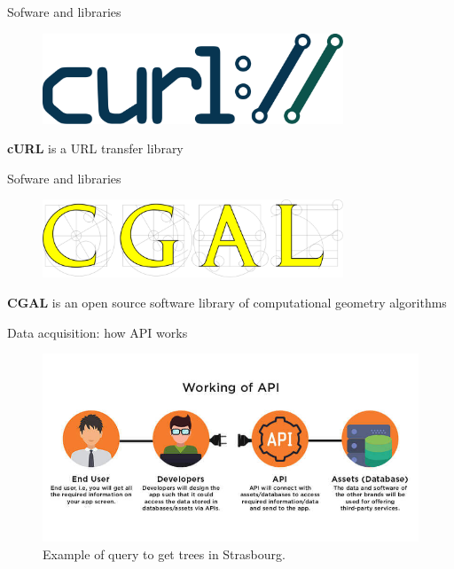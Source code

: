 \documentclass[10pt]{beamer}
\begin{document}
\begin{frame}{Sofware and libraries}
  \begin{figure}[H]
      \centering
      \includegraphics[width=0.8\textwidth]{images/Curl-logo.svg.png}
  \end{figure}
  \begin{center}
  \textbf{cURL} is a URL transfer library
  \end{center}
\end{frame}

\begin{frame}{Sofware and libraries}
  \begin{figure}[H]
      \centering
      \includegraphics[width=0.8\textwidth]{images/cgal_logo.png}
  \end{figure}
  \begin{center}
  \textbf{CGAL} is an open source software library of computational geometry algorithms
  \end{center}
\end{frame}

\begin{frame}{Data acquisition: how API works}
  \begin{figure}[H]
    \centering
    \includegraphics[width=1\textwidth]{images/how-api-works.jpg}
    \caption{Example of query to get trees in Strasbourg.}
  \end{figure}
\end{frame}
\end{document}

